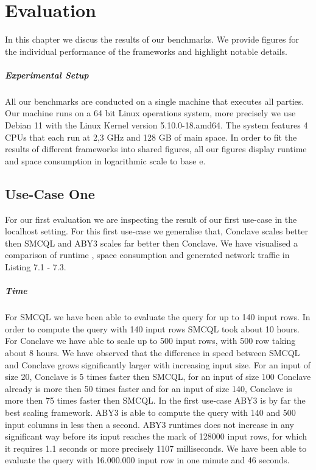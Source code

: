 \chapter{Evaluation}
In this chapter we discus the results of our benchmarks. We provide figures for the individual performance of the frameworks and highlight notable details. 
\paragraph{Experimental Setup}
All our benchmarks are conducted on a single machine that executes all parties. Our machine runs on a 64 bit Linux operations system, more precisely we use Debian 11 with the Linux Kernel version 5.10.0-18.amd64. The system features 4 CPUs that each run at 2,3 GHz and 128 GB of main space. In order to fit the results of different frameworks into shared figures, all our figures display runtime and space consumption in logarithmic scale to base e.    
\section{Use-Case One}
For our first evaluation we are inspecting the result of our first use-case in the localhost setting. For this first use-case we generalise that, Conclave scales better then SMCQL and ABY3 scales far better then Conclave. We have visualised a comparison of runtime , space consumption and generated network traffic in Listing 7.1 - 7.3.
\paragraph{Time}
For SMCQL we have been able to evaluate the query for up to 140 input rows. In order to compute the query with 140 input rows SMCQL took about 10 hours. For Conclave we have able to scale up to 500 input rows, with 500 row taking about 8 hours.
We have observed that the difference in speed between SMCQL and Conclave grows significantly larger with increasing input size. For an input of size 20, Conclave is 5 times faster then SMCQL, for an input of size 100 Conclave already is more then 50 times faster and for an input of size 140, Conclave is more then 75 times faster then SMCQL. In the first use-case ABY3 is by far the best scaling framework. ABY3 is able to compute the query with 140 and 500 input columns in less then a second. ABY3 runtimes does not increase in any significant way before its input reaches the mark of 128000 input rows, for which it requires 1.1 seconds or more precisely 1107 milliseconds. We have been able to evaluate the query with 16.000.000 input row in one minute and 46 seconds. 
